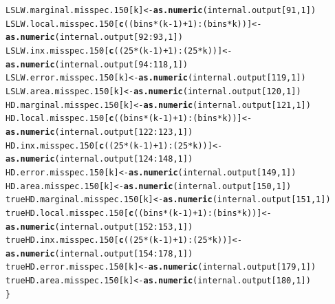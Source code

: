 \documentclass[11pt]{article}\usepackage[]{graphicx}\usepackage[]{color}
\makeatletter
\newcommand{\hlnum}[1]{\textcolor[rgb]{0.686,0.059,0.569}{#1}}%
\newcommand{\hlopt}[1]{\textcolor[rgb]{0,0,0}{#1}}%
\newcommand{\hlstd}[1]{\textcolor[rgb]{0.345,0.345,0.345}{#1}}%
\newcommand{\hlkwb}[1]{\textcolor[rgb]{0.69,0.353,0.396}{#1}}%
\newcommand{\hlkwd}[1]{\textcolor[rgb]{0.737,0.353,0.396}{\textbf{#1}}}%
\newenvironment{kframe}{%
 \def\at@end@of@kframe{}%
 \ifinner\ifhmode%
  \def\at@end@of@kframe{\end{minipage}}%
  \begin{minipage}{\columnwidth}%
 \fi\fi%
 \def\FrameCommand##1{\hskip\@totalleftmargin \hskip-\fboxsep
 \colorbox{shadecolor}{##1}\hskip-\fboxsep
     \hskip-\linewidth \hskip-\@totalleftmargin \hskip\columnwidth}%
 \MakeFramed {\advance\hsize-\width
   \@totalleftmargin\z@ \linewidth\hsize
   \@setminipage}}%
 {\par\unskip\endMakeFramed%
 \at@end@of@kframe}
\newenvironment{knitrout}{}{} %
\makeatother
\begin{document}
\begin{knitrout}
\begin{kframe}
\begin{alltt}
  \hlstd{LSLW.marginal.misspec.150[k]} \hlkwb{<-} \hlkwd{as.numeric}\hlstd{(internal.output[}\hlnum{91}\hlstd{,} \hlnum{1}\hlstd{])}
  \hlstd{LSLW.local.misspec.150[}\hlkwd{c}\hlstd{((bins}\hlopt{*}\hlstd{(k}\hlopt{-}\hlnum{1}\hlstd{)}\hlopt{+}\hlnum{1}\hlstd{)}\hlopt{:}\hlstd{(bins}\hlopt{*}\hlstd{k))]} \hlkwb{<-}
    \hlkwd{as.numeric}\hlstd{(internal.output[}\hlnum{92}\hlopt{:}\hlnum{93}\hlstd{,} \hlnum{1}\hlstd{])}
  \hlstd{LSLW.inx.misspec.150[}\hlkwd{c}\hlstd{((}\hlnum{25}\hlopt{*}\hlstd{(k}\hlopt{-}\hlnum{1}\hlstd{)}\hlopt{+}\hlnum{1}\hlstd{)}\hlopt{:}\hlstd{(}\hlnum{25}\hlopt{*}\hlstd{k))]} \hlkwb{<-}
    \hlkwd{as.numeric}\hlstd{(internal.output[}\hlnum{94}\hlopt{:}\hlnum{118}\hlstd{,} \hlnum{1}\hlstd{])}
  \hlstd{LSLW.error.misspec.150[k]} \hlkwb{<-} \hlkwd{as.numeric}\hlstd{(internal.output[}\hlnum{119}\hlstd{,} \hlnum{1}\hlstd{])}
  \hlstd{LSLW.area.misspec.150[k]} \hlkwb{<-} \hlkwd{as.numeric}\hlstd{(internal.output[}\hlnum{120}\hlstd{,} \hlnum{1}\hlstd{])}
  \hlstd{HD.marginal.misspec.150[k]} \hlkwb{<-} \hlkwd{as.numeric}\hlstd{(internal.output[}\hlnum{121}\hlstd{,} \hlnum{1}\hlstd{])}
  \hlstd{HD.local.misspec.150[}\hlkwd{c}\hlstd{((bins}\hlopt{*}\hlstd{(k}\hlopt{-}\hlnum{1}\hlstd{)}\hlopt{+}\hlnum{1}\hlstd{)}\hlopt{:}\hlstd{(bins}\hlopt{*}\hlstd{k))]} \hlkwb{<-}
    \hlkwd{as.numeric}\hlstd{(internal.output[}\hlnum{122}\hlopt{:}\hlnum{123}\hlstd{,} \hlnum{1}\hlstd{])}
  \hlstd{HD.inx.misspec.150[}\hlkwd{c}\hlstd{((}\hlnum{25}\hlopt{*}\hlstd{(k}\hlopt{-}\hlnum{1}\hlstd{)}\hlopt{+}\hlnum{1}\hlstd{)}\hlopt{:}\hlstd{(}\hlnum{25}\hlopt{*}\hlstd{k))]} \hlkwb{<-}
    \hlkwd{as.numeric}\hlstd{(internal.output[}\hlnum{124}\hlopt{:}\hlnum{148}\hlstd{,} \hlnum{1}\hlstd{])}
  \hlstd{HD.error.misspec.150[k]} \hlkwb{<-} \hlkwd{as.numeric}\hlstd{(internal.output[}\hlnum{149}\hlstd{,} \hlnum{1}\hlstd{])}
  \hlstd{HD.area.misspec.150[k]} \hlkwb{<-} \hlkwd{as.numeric}\hlstd{(internal.output[}\hlnum{150}\hlstd{,} \hlnum{1}\hlstd{])}
  \hlstd{trueHD.marginal.misspec.150[k]} \hlkwb{<-} \hlkwd{as.numeric}\hlstd{(internal.output[}\hlnum{151}\hlstd{,} \hlnum{1}\hlstd{])}
  \hlstd{trueHD.local.misspec.150[}\hlkwd{c}\hlstd{((bins}\hlopt{*}\hlstd{(k}\hlopt{-}\hlnum{1}\hlstd{)}\hlopt{+}\hlnum{1}\hlstd{)}\hlopt{:}\hlstd{(bins}\hlopt{*}\hlstd{k))]} \hlkwb{<-}
    \hlkwd{as.numeric}\hlstd{(internal.output[}\hlnum{152}\hlopt{:}\hlnum{153}\hlstd{,} \hlnum{1}\hlstd{])}
  \hlstd{trueHD.inx.misspec.150[}\hlkwd{c}\hlstd{((}\hlnum{25}\hlopt{*}\hlstd{(k}\hlopt{-}\hlnum{1}\hlstd{)}\hlopt{+}\hlnum{1}\hlstd{)}\hlopt{:}\hlstd{(}\hlnum{25}\hlopt{*}\hlstd{k))]} \hlkwb{<-}
    \hlkwd{as.numeric}\hlstd{(internal.output[}\hlnum{154}\hlopt{:}\hlnum{178}\hlstd{,} \hlnum{1}\hlstd{])}
  \hlstd{trueHD.error.misspec.150[k]} \hlkwb{<-} \hlkwd{as.numeric}\hlstd{(internal.output[}\hlnum{179}\hlstd{,} \hlnum{1}\hlstd{])}
  \hlstd{trueHD.area.misspec.150[k]} \hlkwb{<-} \hlkwd{as.numeric}\hlstd{(internal.output[}\hlnum{180}\hlstd{,} \hlnum{1}\hlstd{])}
\hlstd{\}}
\end{alltt}
\end{kframe}
\end{knitrout}
\end{document}
